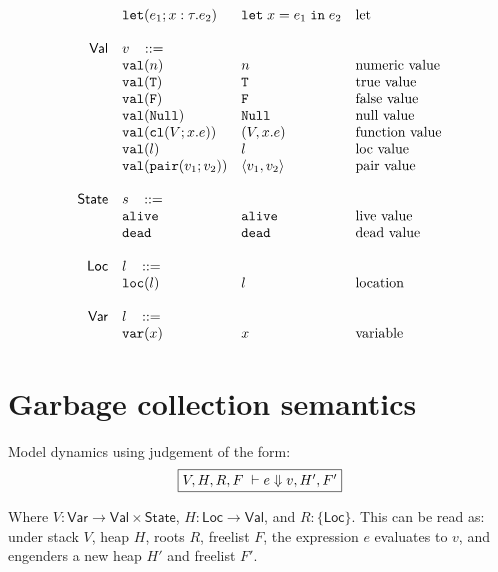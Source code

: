 \documentclass[11pt]{article}
\newcommand{\ms}[1]{\ensuremath{\mathsf{#1}}}
\newcommand{\irl}[1]{\mathtt{#1}}
\begin{document}
\[\begin{array}{r l l l l}
  & \irl{let}(e_1; x : \tau.e_2)			& \irl{let}\; x = e_1 \; \irl{in}\; e_2   	& \text{let}\\
  \\
\ms{Val}
        & v   \,\,\,\,\, ::= \\
 	& \irl{val}(n)                                			& n 												& \text{numeric value}\\
 	& \irl{val}(\irl{T})                               			& \irl{T} 								  & \text{true value}\\
 	& \irl{val}(\irl{F})                                			& \irl{F}								  & \text{false value}\\
 	& \irl{val}(\irl{Null})                                  & \irl{Null} 								  & \text{null value}\\
 	& \irl{val}(\irl{cl}(V; x.e))                & (V, x.e) 					& \text{function value}\\
 	& \irl{val}(l)                                			& l 								  & \text{loc value}\\
 	& \irl{val}(\pairexabt{v_1}{v_2})                             & \pairexcst{v_1}{v_2} 								  & \text{pair value}\\
  \\
\ms{State} & s   \,\,\,\,\, ::= \\
 	& \irl{alive}                                			& \irl{alive} 												& \text{live value}\\
 	& \irl{dead}                                			& \irl{dead} 												& \text{dead value}\\\\
\ms{Loc} & l   \,\,\,\,\, ::= \\
 	& \irl{loc}(l)                                			& l 												& \text{location}\\\\
\ms{Var} & l   \,\,\,\,\, ::= \\
 	& \irl{var}(x)                                			& x 												& \text{variable}\\
\end{array}
\]

\section{Garbage collection semantics}

Model dynamics using judgement of the form:
\[
\fbox{$V,H,R,F \; \vdash e \Downarrow v, H', F'$}
\]

\noindent
Where $V : \ms{Var} \to \ms{Val} \times \ms{State}$, $H : \ms{Loc} \to \ms{Val}$, and $R : \{\ms{Loc}\}$. This can be read as: under stack $V$, heap $H$, roots $R$,
freelist $F$, the expression $e$ evaluates to $v$, and engenders a new heap $H'$ and freelist $F'$.\\
\end{document}
